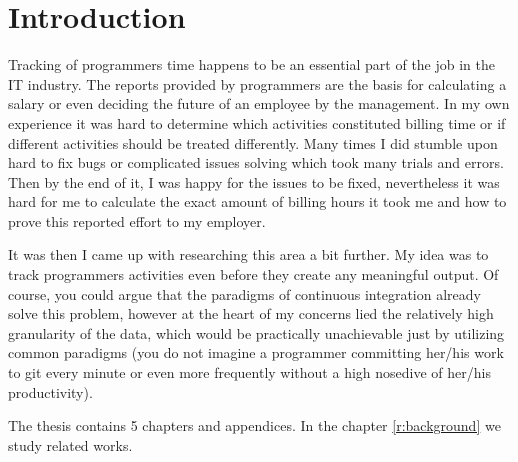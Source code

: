 \chapter{Introduction}

Tracking of programmers time happens to be an essential part of the job in the IT industry.
The reports provided by programmers are the basis for calculating a salary or even deciding
the future of an employee by the management. In my own experience it was hard to determine
which activities constituted billing time or if different activities should be treated
differently. Many times I did stumble upon hard to fix bugs or complicated issues solving
which took many trials and errors. Then by the end of it, I was happy for the issues to be
fixed, nevertheless it was hard for me to calculate the exact amount of billing hours it
took me and how to prove this reported effort to my employer.

It was then I came up with researching this area a bit further. My idea was to track
programmers activities even before they create any meaningful output. Of course, you
could argue that the paradigms of continuous integration already solve this problem,
however at the heart of my concerns lied the relatively high granularity of the data,
which would be practically unachievable just by utilizing common paradigms (you do not
imagine a programmer committing her/his work to git every minute or even more frequently
without a high nosedive of her/his productivity).

The thesis contains 5 chapters and appendices.
In the chapter \ref{r:background} we study related works.



